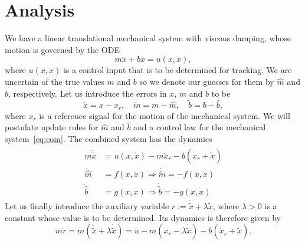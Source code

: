 \section{Analysis} 
\label{sec:analysis}

We have a linear translational mechanical system with viscous damping, whose
motion is governed by the ODE
%
\begin{equation}
    m \ddot{x} + b\dot{x} = u(x, \dot{x}),
    \label{eq:eom}
\end{equation}
%
where $u(x, \dot{x})$ is a control input that is to be determined for tracking. We are
uncertain of the true values $m$ and $b$ so we denote our guesses for them
by $\hat{m}$ and $\hat{b}$, respectively. Let us introduce the errors in $x$,
$m$ and $b$ to be \[ \tilde{x} = x - x_r, \quad \tilde{m} = m - \hat{m}, \quad
\tilde{b} = b - \hat{b}, \] where $x_r$ is a reference signal for the motion of
the mechanical system. We will postulate update rules for $\hat{m}$ and
$\hat{b}$ and a control law for the mechanical system~\eqref{eq:eom}. The
combined system has the dynamics
%
\begin{align}
    \begin{split}
    m\ddot{\tilde{x}} &= u(x, \dot{x}) - m\ddot{x}_r - b(\dot{x}_r + \dot{\tilde{x}}) \\
    \dot{\hat{m}} &= f(x, \dot{x}) \Rightarrow \dot{\tilde{m}} = -f(x, \dot{x}) \\
    \dot{\hat{b}} &= g(x, \dot{x}) \Rightarrow \dot{\tilde{b}} = -g(x, \dot{x})
    \end{split}
    \label{eq:combined}
\end{align}
%
Let us finally introduce the auxiliary variable $r := \dot{\tilde{x}} + \lambda
\tilde{x}$, where $\lambda > 0$ is a constant whose value is to be determined.
Its dynamics is therefore given by \[ m\dot{r} = m\left(\ddot{\tilde{x}} +
\lambda \dot{\tilde{x}}\right) = u - m(\ddot{x}_r - \lambda\dot{\tilde{x}}) - 
b(\dot{x}_r + \dot{\tilde{x}}). \]

